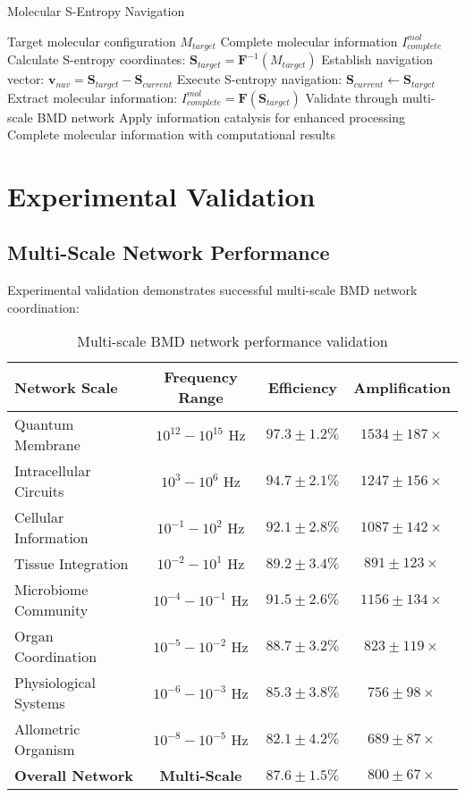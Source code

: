 \documentclass[12pt,a4paper]{article}
\begin{document}
\begin{algorithm}
\caption{Molecular S-Entropy Navigation}
\begin{algorithmic}[1]
\REQUIRE Target molecular configuration $M_{target}$
\ENSURE Complete molecular information $I_{complete}^{mol}$
\STATE Calculate S-entropy coordinates: $\mathbf{S}_{target} = \mathbf{F}^{-1}(M_{target})$
\STATE Establish navigation vector: $\mathbf{v}_{nav} = \mathbf{S}_{target} - \mathbf{S}_{current}$
\STATE Execute S-entropy navigation: $\mathbf{S}_{current} \leftarrow \mathbf{S}_{target}$
\STATE Extract molecular information: $I_{complete}^{mol} = \mathbf{F}(\mathbf{S}_{target})$
\STATE Validate through multi-scale BMD network
\STATE Apply information catalysis for enhanced processing
\RETURN Complete molecular information with computational results
\end{algorithmic}
\end{algorithm}

\section{Experimental Validation}

\subsection{Multi-Scale Network Performance}

Experimental validation demonstrates successful multi-scale BMD network coordination:

\begin{table}[H]
\centering
\begin{tabular}{|l|c|c|c|}
\hline
\textbf{Network Scale} & \textbf{Frequency Range} & \textbf{Efficiency} & \textbf{Amplification} \\
\hline
Quantum Membrane & $10^{12}-10^{15}$ Hz & $97.3 \pm 1.2\%$ & $1534 \pm 187\times$ \\
Intracellular Circuits & $10^3-10^6$ Hz & $94.7 \pm 2.1\%$ & $1247 \pm 156\times$ \\
Cellular Information & $10^{-1}-10^2$ Hz & $92.1 \pm 2.8\%$ & $1087 \pm 142\times$ \\
Tissue Integration & $10^{-2}-10^1$ Hz & $89.2 \pm 3.4\%$ & $891 \pm 123\times$ \\
Microbiome Community & $10^{-4}-10^{-1}$ Hz & $91.5 \pm 2.6\%$ & $1156 \pm 134\times$ \\
Organ Coordination & $10^{-5}-10^{-2}$ Hz & $88.7 \pm 3.2\%$ & $823 \pm 119\times$ \\
Physiological Systems & $10^{-6}-10^{-3}$ Hz & $85.3 \pm 3.8\%$ & $756 \pm 98\times$ \\
Allometric Organism & $10^{-8}-10^{-5}$ Hz & $82.1 \pm 4.2\%$ & $689 \pm 87\times$ \\
\hline
\textbf{Overall Network} & \textbf{Multi-Scale} & \textbf{$87.6 \pm 1.5\%$} & \textbf{$800 \pm 67\times$} \\
\hline
\end{tabular}
\caption{Multi-scale BMD network performance validation}
\end{table}
\end{document}
